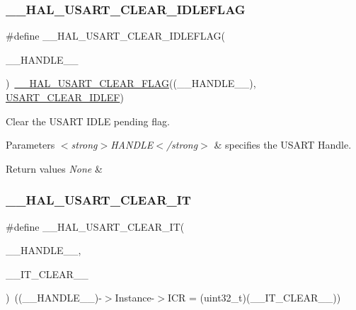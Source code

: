 \subsubsection{\texorpdfstring{\+\_\+\+\_\+\+H\+A\+L\+\_\+\+U\+S\+A\+R\+T\+\_\+\+C\+L\+E\+A\+R\+\_\+\+I\+D\+L\+E\+F\+L\+AG}{\_\_HAL\_USART\_CLEAR\_IDLEFLAG}}
{\footnotesize\ttfamily \#define \+\_\+\+\_\+\+H\+A\+L\+\_\+\+U\+S\+A\+R\+T\+\_\+\+C\+L\+E\+A\+R\+\_\+\+I\+D\+L\+E\+F\+L\+AG(\begin{DoxyParamCaption}\item[{}]{\+\_\+\+\_\+\+H\+A\+N\+D\+L\+E\+\_\+\+\_\+ }\end{DoxyParamCaption})~\hyperlink{group___u_s_a_r_t___exported___macros_gaff3cb6ff740b240764e7844eaf3d6807}{\+\_\+\+\_\+\+H\+A\+L\+\_\+\+U\+S\+A\+R\+T\+\_\+\+C\+L\+E\+A\+R\+\_\+\+F\+L\+AG}((\+\_\+\+\_\+\+H\+A\+N\+D\+L\+E\+\_\+\+\_\+), \hyperlink{group___u_s_a_r_t___i_t___c_l_e_a_r___flags_gad9927597dca4f88a05c0d5151049470a}{U\+S\+A\+R\+T\+\_\+\+C\+L\+E\+A\+R\+\_\+\+I\+D\+L\+EF})}



Clear the U\+S\+A\+RT I\+D\+LE pending flag. 


\begin{DoxyParams}{Parameters}
{\em $<$strong$>$\+H\+A\+N\+D\+L\+E$<$/strong$>$} & specifies the U\+S\+A\+RT Handle. \\
\hline
\end{DoxyParams}

\begin{DoxyRetVals}{Return values}
{\em None} & \\
\hline
\end{DoxyRetVals}
\mbox{\label{group___u_s_a_r_t___exported___macros_gada9f2da0bfc3dfd21ccb161d2ef26e93}} 
\subsubsection{\texorpdfstring{\+\_\+\+\_\+\+H\+A\+L\+\_\+\+U\+S\+A\+R\+T\+\_\+\+C\+L\+E\+A\+R\+\_\+\+IT}{\_\_HAL\_USART\_CLEAR\_IT}}
{\footnotesize\ttfamily \#define \+\_\+\+\_\+\+H\+A\+L\+\_\+\+U\+S\+A\+R\+T\+\_\+\+C\+L\+E\+A\+R\+\_\+\+IT(\begin{DoxyParamCaption}\item[{}]{\+\_\+\+\_\+\+H\+A\+N\+D\+L\+E\+\_\+\+\_\+,  }\item[{}]{\+\_\+\+\_\+\+I\+T\+\_\+\+C\+L\+E\+A\+R\+\_\+\+\_\+ }\end{DoxyParamCaption})~((\+\_\+\+\_\+\+H\+A\+N\+D\+L\+E\+\_\+\+\_\+)-\/$>$Instance-\/$>$I\+CR = (uint32\+\_\+t)(\+\_\+\+\_\+\+I\+T\+\_\+\+C\+L\+E\+A\+R\+\_\+\+\_\+))}



